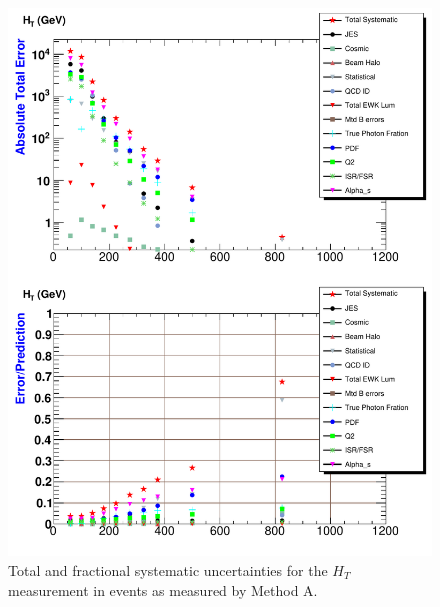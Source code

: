 \begin{figure}[p]
 \centering
 \includegraphics[scale=.7,keepaspectratio=true]{./G30Jets_Errs_MtdA_plot1_Ht.pdf}
 \caption{Total and fractional systematic uncertainties for the $H_{T}$ measurement in \phoonejet events as measured by Method A.}
 \label{fig:g30Jets_Errs_MtdA_plot1_Ht}
\end{figure}

